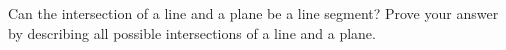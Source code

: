 Can the intersection of a line and a plane be a line segment? Prove your answer by describing all possible intersections of a line and a plane.
